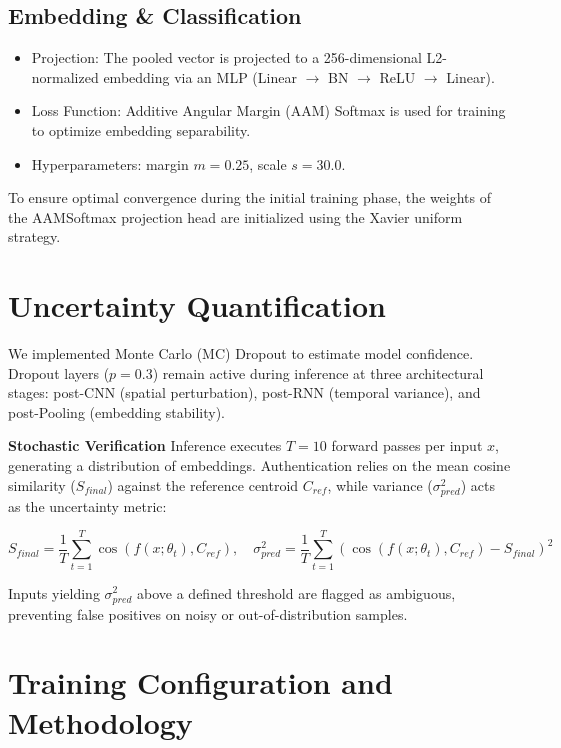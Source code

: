 \documentclass[12pt,a4paper]{article}
\begin{document}
\subsection{Embedding \& Classification}
\begin{itemize}
    \item Projection: The pooled vector is projected to a 256-dimensional L2-normalized embedding via an MLP (Linear $\to$ BN $\to$ ReLU $\to$ Linear).
    \item Loss Function: Additive Angular Margin (AAM) Softmax is used for training to optimize embedding separability.
    \item Hyperparameters: margin $m=0.25$, scale $s=30.0$.
\end{itemize}
To ensure optimal convergence during the initial training phase, the weights of the AAMSoftmax projection head are initialized using the Xavier uniform strategy.


\section{Uncertainty Quantification}

We implemented Monte Carlo (MC) Dropout to estimate model confidence. 
Dropout layers ($p=0.3$) remain active during inference at three architectural stages: 
post-CNN (spatial perturbation), post-RNN (temporal variance), and post-Pooling (embedding stability).

\textbf{Stochastic Verification}
\newline
Inference executes $T=10$ forward passes per input $x$, generating a distribution of embeddings. 
Authentication relies on the mean cosine similarity ($S_{final}$) against the reference centroid $C_{ref}$, while variance ($\sigma^2_{pred}$) acts as the uncertainty metric:

\begin{equation}
    S_{final} = \frac{1}{T} \sum_{t=1}^{T} \cos(f(x; \theta_t), C_{ref}), \quad 
    \sigma^2_{pred} = \frac{1}{T} \sum_{t=1}^{T} \left( \cos(f(x; \theta_t), C_{ref}) - S_{final} \right)^2
\end{equation}

Inputs yielding $\sigma^2_{pred}$ above a defined threshold are flagged as ambiguous, preventing false positives on noisy or out-of-distribution samples.





\section{Training Configuration and Methodology}
\end{document}
